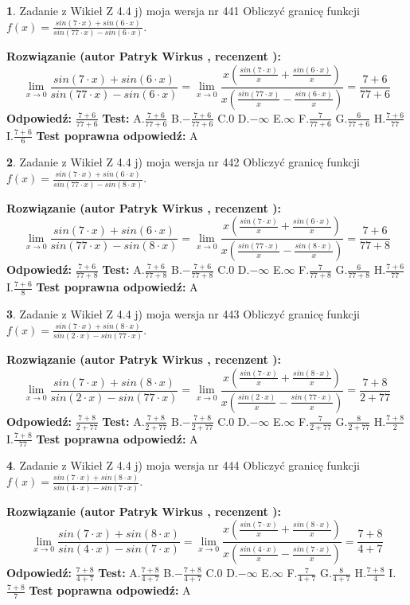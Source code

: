 \documentclass[12pt, a4paper]{article}
\theoremstyle{definition} %
\newtheorem{zad}{}
\newcommand{\zadStart}[1]{\begin{zad}#1\newline}
\newcommand{\zadStop}{\end{zad}}
\newcommand{\rozwStart}[2]{\noindent \textbf{Rozwiązanie (autor #1 , recenzent #2): }\newline}
\newcommand{\rozwStop}{\newline}
\newcommand{\odpStart}{\noindent \textbf{Odpowiedź:}\newline}
\newcommand{\odpStop}{\newline}
\newcommand{\testStart}{\noindent \textbf{Test:}\newline}
\newcommand{\testStop}{\newline}
\newcommand{\kluczStart}{\noindent \textbf{Test poprawna odpowiedź:}\newline}
\newcommand{\kluczStop}{\newline}
\begin{document}
\zadStart{Zadanie z Wikieł Z 4.4 j) moja wersja nr 441}
Obliczyć granicę funkcji $f(x)=\frac{sin(7\cdot x) +sin(6\cdot x)}{sin(77\cdot x) -sin(6\cdot x)}$.
\zadStop
\rozwStart{Patryk Wirkus}{}
$$\lim\limits_{x\to 0}\frac{sin(7\cdot x) +sin(6\cdot x)}{sin(77\cdot x) -sin(6\cdot x)}=\lim\limits_{x\to 0}\frac{x(\frac{sin(7\cdot x)}{x}+\frac{sin(6\cdot x)}{x})}{x(\frac{sin(77\cdot x)}{x}-\frac{sin(6\cdot x)}{x})}=\frac{7+6}{77+6}$$
\rozwStop
\odpStart
$\frac{7+6}{77+6}$
\odpStop
\testStart
A.$\frac{7+6}{77+6}$
B.$-\frac{7+6}{77+6}$
C.$0$
D.$-\infty$
E.$\infty$
F.$\frac{7}{77+6}$
G.$\frac{6}{77+6}$
H.$\frac{7+6}{77}$
I.$\frac{7+6}{6}$
\testStop
\kluczStart
A
\kluczStop



\zadStart{Zadanie z Wikieł Z 4.4 j) moja wersja nr 442}
Obliczyć granicę funkcji $f(x)=\frac{sin(7\cdot x) +sin(6\cdot x)}{sin(77\cdot x) -sin(8\cdot x)}$.
\zadStop
\rozwStart{Patryk Wirkus}{}
$$\lim\limits_{x\to 0}\frac{sin(7\cdot x) +sin(6\cdot x)}{sin(77\cdot x) -sin(8\cdot x)}=\lim\limits_{x\to 0}\frac{x(\frac{sin(7\cdot x)}{x}+\frac{sin(6\cdot x)}{x})}{x(\frac{sin(77\cdot x)}{x}-\frac{sin(8\cdot x)}{x})}=\frac{7+6}{77+8}$$
\rozwStop
\odpStart
$\frac{7+6}{77+8}$
\odpStop
\testStart
A.$\frac{7+6}{77+8}$
B.$-\frac{7+6}{77+8}$
C.$0$
D.$-\infty$
E.$\infty$
F.$\frac{7}{77+8}$
G.$\frac{6}{77+8}$
H.$\frac{7+6}{77}$
I.$\frac{7+6}{8}$
\testStop
\kluczStart
A
\kluczStop



\zadStart{Zadanie z Wikieł Z 4.4 j) moja wersja nr 443}
Obliczyć granicę funkcji $f(x)=\frac{sin(7\cdot x) +sin(8\cdot x)}{sin(2\cdot x) -sin(77\cdot x)}$.
\zadStop
\rozwStart{Patryk Wirkus}{}
$$\lim\limits_{x\to 0}\frac{sin(7\cdot x) +sin(8\cdot x)}{sin(2\cdot x) -sin(77\cdot x)}=\lim\limits_{x\to 0}\frac{x(\frac{sin(7\cdot x)}{x}+\frac{sin(8\cdot x)}{x})}{x(\frac{sin(2\cdot x)}{x}-\frac{sin(77\cdot x)}{x})}=\frac{7+8}{2+77}$$
\rozwStop
\odpStart
$\frac{7+8}{2+77}$
\odpStop
\testStart
A.$\frac{7+8}{2+77}$
B.$-\frac{7+8}{2+77}$
C.$0$
D.$-\infty$
E.$\infty$
F.$\frac{7}{2+77}$
G.$\frac{8}{2+77}$
H.$\frac{7+8}{2}$
I.$\frac{7+8}{77}$
\testStop
\kluczStart
A
\kluczStop



\zadStart{Zadanie z Wikieł Z 4.4 j) moja wersja nr 444}
Obliczyć granicę funkcji $f(x)=\frac{sin(7\cdot x) +sin(8\cdot x)}{sin(4\cdot x) -sin(7\cdot x)}$.
\zadStop
\rozwStart{Patryk Wirkus}{}
$$\lim\limits_{x\to 0}\frac{sin(7\cdot x) +sin(8\cdot x)}{sin(4\cdot x) -sin(7\cdot x)}=\lim\limits_{x\to 0}\frac{x(\frac{sin(7\cdot x)}{x}+\frac{sin(8\cdot x)}{x})}{x(\frac{sin(4\cdot x)}{x}-\frac{sin(7\cdot x)}{x})}=\frac{7+8}{4+7}$$
\rozwStop
\odpStart
$\frac{7+8}{4+7}$
\odpStop
\testStart
A.$\frac{7+8}{4+7}$
B.$-\frac{7+8}{4+7}$
C.$0$
D.$-\infty$
E.$\infty$
F.$\frac{7}{4+7}$
G.$\frac{8}{4+7}$
H.$\frac{7+8}{4}$
I.$\frac{7+8}{7}$
\testStop
\kluczStart
A
\kluczStop
\end{document}
